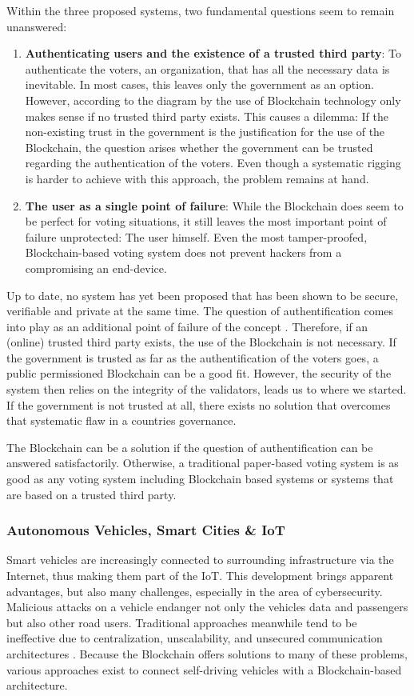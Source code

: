 Within the three proposed systems, two fundamental questions seem to remain unanswered:
\begin{enumerate}
    \item \textbf{Authenticating users and the existence of a trusted third party}: To authenticate the voters, an organization, that has all the necessary data is inevitable. In most cases, this leaves only the government as an option. However, according to the diagram by \cite{Wust2017} the use of Blockchain technology only makes sense if no trusted third party exists. This causes a dilemma: If the non-existing trust in the government is the justification for the use of the Blockchain, the question arises whether the government can be trusted regarding the authentication of the voters. Even though a systematic rigging is harder to achieve with this approach, the problem remains at hand.
    \item \textbf{The user as a single point of failure}: While the Blockchain does seem to be perfect for voting situations, it still leaves the most important point of failure unprotected: The user himself. Even the most tamper-proofed, Blockchain-based voting system does not prevent hackers from a compromising an end-device.
\end{enumerate}

Up to date, no system has yet been proposed that has been shown to be secure, verifiable and private at the same time. The question of authentification comes into play as an additional point of failure of the concept \cite{Osgood2016}.
Therefore, if an (online) trusted third party exists, the use of the Blockchain is not necessary. If the government is trusted as far as the authentification of the voters goes, a public permissioned Blockchain can be a good fit. However, the security of the system then relies on the integrity of the validators,  leads us to where we started. If the government is not trusted at all, there exists no solution that overcomes that systematic flaw in a countries governance.

The Blockchain can be a solution if the question of authentification can be answered satisfactorily. Otherwise, a traditional paper-based voting system is as good as any voting system including Blockchain based systems or systems that are based on a trusted third party.

\subsubsection{Autonomous Vehicles, Smart Cities \& IoT}
Smart vehicles are increasingly connected to surrounding infrastructure via the Internet, thus making them part of the IoT. This development brings apparent advantages, but also many challenges, especially in the area of cybersecurity. Malicious attacks on a vehicle endanger not only the vehicles data and passengers but also other road users. Traditional approaches meanwhile tend to be ineffective due to centralization, unscalability, and unsecured communication architectures \cite{DorriSteger2017}. Because the Blockchain offers solutions to many of these problems, various approaches exist to connect self-driving vehicles with a Blockchain-based architecture.

